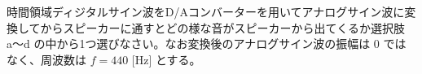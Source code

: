 時間領域ディジタルサイン波をD/Aコンバーターを用いてアナログサイン波に変換してからスピーカーに通すとどの様な音がスピーカーから出てくるか選択肢 a〜d の中から1つ選びなさい。なお変換後のアナログサイン波の振幅は $0$ ではなく、周波数は $f = 440$ [Hz] とする。


